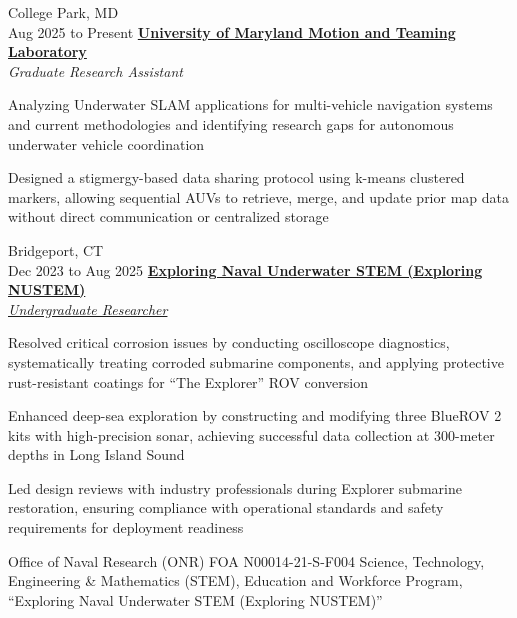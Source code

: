     \vspace{0.20 cm}
    
    \begin{twocolentry}{College Park, MD \\ Aug 2025 to Present}
         \href{https://ottelab.com}{\textbf{University of Maryland Motion and Teaming Laboratory}}\\
        \textit{Graduate Research Assistant}
    \end{twocolentry}

    \vspace{0.10 cm}
    \begin{onecolentry}
        \begin{highlights}
        	\item Analyzing Underwater SLAM applications for multi-vehicle navigation systems and current methodologies and identifying research gaps for autonomous underwater vehicle coordination
        	\item Designed a stigmergy-based data sharing protocol using k-means clustered markers, allowing sequential AUVs to retrieve, merge, and update prior map data without direct communication or centralized storage
        \end{highlights}
    \end{onecolentry}  
    
    \vspace{0.20 cm}
    
    \begin{twocolentry}{Bridgeport, CT \\ Dec 2023 to Aug 2025}
        \href{https://nustem.bridgeport.edu/}{\textbf{Exploring Naval Underwater STEM (Exploring NUSTEM)}\\ 
        \textit{Undergraduate Researcher}}
    \end{twocolentry}

    \vspace{0.10 cm}
    \begin{onecolentry}
        \begin{highlights}
            \item Resolved critical corrosion issues by conducting oscilloscope diagnostics, systematically treating corroded submarine components, and applying protective rust-resistant coatings for ``The Explorer'' ROV conversion
            \item Enhanced deep-sea exploration by constructing and modifying three BlueROV 2 kits with high-precision sonar, achieving successful data collection at 300-meter depths in Long Island Sound
            \item Led design reviews with industry professionals during Explorer submarine restoration, ensuring compliance with operational standards and safety requirements for deployment readiness
            \item Office of Naval Research (ONR) FOA N00014-21-S-F004 Science, Technology, Engineering \& Mathematics (STEM), Education and Workforce Program, “Exploring Naval Underwater STEM (Exploring NUSTEM)”
        \end{highlights}
    \end{onecolentry}

